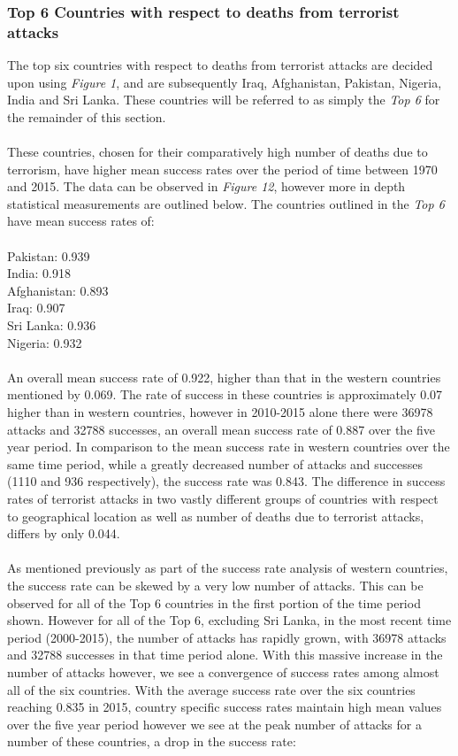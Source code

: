 \documentclass[10pt,a4paper]{article}
\begin{document}
\subsubsection{Top 6 Countries with respect to deaths from terrorist attacks}
The top six countries with respect to deaths from terrorist attacks are decided upon using \textit{Figure 1}, and are subsequently Iraq, Afghanistan, Pakistan, Nigeria, India and Sri Lanka. These countries will be referred to as simply the \textit{Top 6} for the remainder of this section.
\\\\
These countries, chosen for their comparatively high number of deaths due to terrorism, have higher mean success rates over the period of time between 1970 and 2015.
The data can be observed in \textit{Figure 12}, however more in depth statistical measurements are outlined below. The countries outlined in the \textit{Top 6} have mean success rates of:
\\\\ 
\indent Pakistan: 0.939\\
\indent India: 0.918\\
\indent Afghanistan: 0.893\\
\indent Iraq: 0.907\\
\indent Sri Lanka: 0.936\\
\indent Nigeria: 0.932\\
\\
An overall mean success rate of 0.922, higher than that in the western countries mentioned by 0.069. The rate of success in these countries is approximately 0.07 higher than in western countries, however in 2010-2015 alone there were 36978 attacks and 32788 successes, an overall mean success rate of 0.887 over the five year period. In comparison to the mean success rate in western countries over the same time period, while a greatly decreased number of attacks and successes (1110 and 936 respectively), the success rate was 0.843. The difference in success rates of terrorist attacks in two vastly different groups of countries with respect to geographical location as well as number of deaths due to terrorist attacks, differs by only 0.044.
\\\\
As mentioned previously as part of the success rate analysis of western countries, the success rate can be skewed by a very low number of attacks. This can be observed for all of the Top 6 countries in the first portion of the time period shown. However for all of the Top 6, excluding Sri Lanka, in the most recent time period (2000-2015), the number of attacks has rapidly grown, with 36978 attacks and 32788 successes in that time period alone. With this massive increase in the number of attacks however, we see a convergence of success rates among almost all of the six countries. With the average success rate over the six countries reaching 0.835 in 2015, country specific success rates maintain high mean values over the five year period however we see at the peak number of attacks for a number of these countries, a drop in the success rate:
\end{document}
